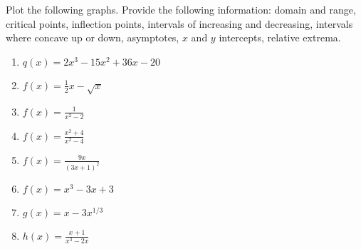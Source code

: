 \documentclass[12pt,letterpaper]{article}
\newenvironment{problem}[2][Problem]{\begin{trivlist}
\item[\hskip \labelsep {\bfseries #1}\hskip \labelsep {\bfseries #2.}]}{\end{trivlist}}
\begin{document}



\begin{problem}{1}
  Plot the following graphs.  Provide the following information: domain and range, critical points, inflection points, intervals of increasing and decreasing, intervals where concave up or down, asymptotes, $x$ and $y$ intercepts, relative extrema.

  \begin{enumerate}
    \item $q(x)= 2x^3-15x^2+36x -20$
    \item $\displaystyle f(x) = \frac{1}{2}x-\sqrt{x}$
  \item $\displaystyle f(x) = \frac{1}{x^2 - 2}$
  \item $\displaystyle f(x) = \frac{x^2+4}{x^2-4}$
  \item $\displaystyle f(x)=\frac{9x}{(3x+1)^2}$
  \item $\displaystyle f(x)=x^3-3x+3$
  \item $\displaystyle   g(x) = x - 3x^{1/3}$
    \item $\displaystyle h(x) = \displaystyle \frac{x+1}{x^3-2x}$
  \end{enumerate}

  
\end{problem}
\end{document}
